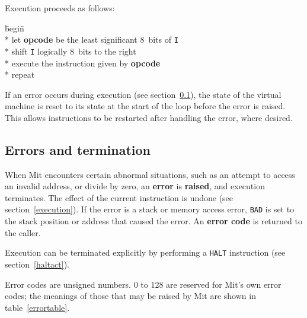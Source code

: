 \documentclass[a4paper]{article}
\newcommand{\instsize}{$8$}
\begin{document}
Execution proceeds as follows:

\begin{tabbing}
\hspace{0.5in}\=begin\=\+\+ \\*
let \textbf{opcode} be the least significant \instsize\ bits of {\tt I} \\*
shift {\tt I} logically \instsize\ bits to the right \\*
execute the instruction given by \textbf{opcode} \- \\*
repeat
\end{tabbing}

If an error occurs during execution (see section~\ref{errors}), the state of the virtual machine is reset to its state at the start of the loop before the error is raised. This allows instructions to be restarted after handling the error, where desired.

\subsection{Errors and termination}
\label{errors}

When Mit encounters certain abnormal situations, such as an attempt to access an invalid address, or divide by zero, an {\bf error} is {\bf raised}, and execution terminates. The effect of the current instruction is undone (see section~\ref{execution}). If the error is a stack or memory access error, {\tt BAD} is set to the stack position or address that caused the error. An {\bf error code} is returned to the caller.

Execution can be terminated explicitly by performing a {\tt HALT} instruction (see section~\ref{haltact}).

Error codes are unsigned numbers. $0$ to $128$ are reserved for Mit's own error codes; the meanings of those that may be raised by Mit are shown in table~\ref{errortable}.
\end{document}
